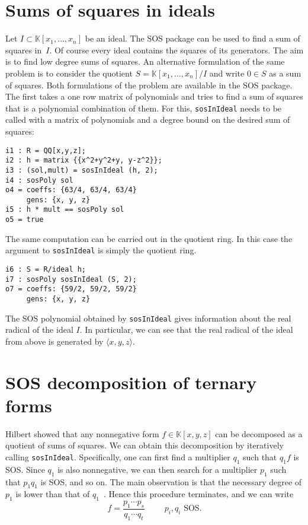 \documentclass[11pt]{amsart}
\theoremstyle{plain}%
\theoremstyle{definition}
\theoremstyle{remark}
\newcommand{\SOS}{\textsc{SOS}\xspace}
\newcommand{\kk}{\mathbb{K}}
\begin{document}

\section{Sums of squares in ideals}
Let $I \subset \kk[x_{1},\dots,x_{n}]$ be an ideal.  The \SOS package can be used to find a sum of squares in~$I$.
Of course every ideal contains the squares of its generators.
The aim is to find low degree sums of squares.
An alternative formulation of the same problem is to consider the quotient $S = \kk[x_{1},\dots,x_{n}]/I$ and write $0\in S$ as a sum of squares.
Both formulations of the problem are available in the \SOS package.
The first takes a one row matrix of polynomials and tries to find a sum of squares that is a polynomial combination of them.
For this, \verb|sosInIdeal| needs to be called with a matrix of polynomials and a degree bound on the desired sum of squares:
{\small
\begin{verbatim}
i1 : R = QQ[x,y,z];
i2 : h = matrix {{x^2+y^2+y, y-z^2}};
i3 : (sol,mult) = sosInIdeal (h, 2);
i4 : sosPoly sol
o4 = coeffs: {63/4, 63/4, 63/4}
     gens: {x, y, z}
i5 : h * mult == sosPoly sol
o5 = true
\end{verbatim}
}
The same computation can be carried out in the quotient ring.
In this case the argument to \verb|sosInIdeal| is simply the quotient ring.
{\small
\begin{verbatim}
i6 : S = R/ideal h;
i7 : sosPoly sosInIdeal (S, 2);
o7 = coeffs: {59/2, 59/2, 59/2}
     gens: {x, y, z}
\end{verbatim}
}
The SOS polynomial obtained by \verb|sosInIdeal| gives information about the real radical of the ideal $I$.
In particular, we can see that the real radical of the ideal from above is generated by $\langle x,y,z\rangle$.

\section{SOS decomposition of ternary forms}

Hilbert showed that any nonnegative form $f\in \kk[x,y,z]$ can be decomposed as a quotient of sums of squares.
We can obtain this decomposition by iteratively calling \verb|sosInIdeal|.
Specifically, one can first find a multiplier $q_{1}$ such that $q_{1}f$ is SOS.
Since $q_1$ is also nonnegative, we can then search for a multiplier $p_{1}$ such that $p_{1}q_{1}$ is SOS, and so on.
The main observation is that the necessary degree of $p_{1}$ is lower than that of $q_{1}$~\cite{de2004products}.
Hence this procedure terminates, and we can write
\[
  f = \frac{p_{1}\cdots p_{s}}{q_{1}\cdots q_{t}} \qquad \text {
    $p_{i},q_{i}$ SOS}.
\]
\end{document}
